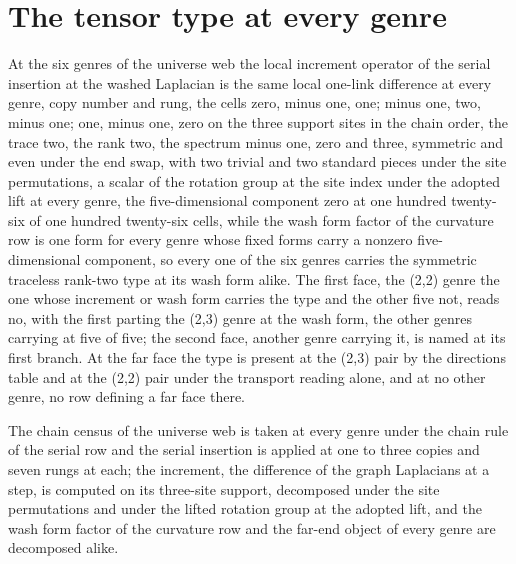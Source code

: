 \section{The tensor type at every genre}\label{mod:I-2-D543154-w-tntp}
\begin{chwall}\label{box:I-2-D543154-w-tntp:1}
At the six genres of the universe web the local increment operator of the serial insertion at the washed Laplacian is the same local one-link difference at every genre, copy number and rung, the cells zero, minus one, one; minus one, two, minus one; one, minus one, zero on the three support sites in the chain order, the trace two, the rank two, the spectrum minus one, zero and three, symmetric and even under the end swap, with two trivial and two standard pieces under the site permutations, a scalar of the rotation group at the site index under the adopted lift at every genre, the five-dimensional component zero at one hundred twenty-six of one hundred twenty-six cells, while the wash form factor of the curvature row is one form for every genre whose fixed forms carry a nonzero five-dimensional component, so every one of the six genres carries the symmetric traceless rank-two type at its wash form alike. The first face, the (2,2) genre the one whose increment or wash form carries the type and the other five not, reads no, with the first parting the (2,3) genre at the wash form, the other genres carrying at five of five; the second face, another genre carrying it, is named at its first branch. At the far face the type is present at the (2,3) pair by the directions table and at the (2,2) pair under the transport reading alone, and at no other genre, no row defining a far face there.
\end{chwall}
The chain census of the universe web is taken at every genre under the chain rule of the serial row and the serial insertion is applied at one to three copies and seven rungs at each; the increment, the difference of the graph Laplacians at a step, is computed on its three-site support, decomposed under the site permutations and under the lifted rotation group at the adopted lift, and the wash form factor of the curvature row and the far-end object of every genre are decomposed alike.

